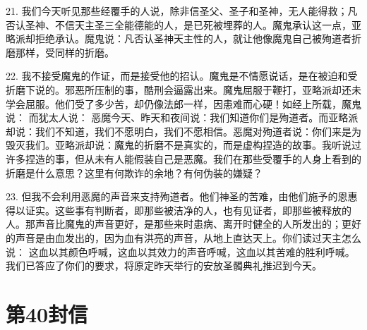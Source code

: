 21. 我们今天听见那些经覆手的人说，除非信圣父、圣子和圣神，无人能得救；凡否认圣神、不信天主圣三全能德能的人，是已死被埋葬的人。魔鬼承认这一点，亚略派却拒绝承认。魔鬼说：凡否认圣神天主性的人，就让他像魔鬼自己被殉道者折磨那样，受同样的折磨。\par

22. 我不接受魔鬼的作证，而是接受他的招认。魔鬼是不情愿说话，是在被迫和受折磨下说的。邪恶所压制的事，酷刑会逼露出来。魔鬼屈服于鞭打，亚略派却还未学会屈服。他们受了多少苦，却仍像法郎一样，因患难而心硬！如经上所载，魔鬼说： 而犹太人说： 恶魔今天、昨天和夜间说：我们知道你们是殉道者。而亚略派却说：我们不知道，我们不愿明白，我们不愿相信。恶魔对殉道者说：你们来是为毁灭我们。亚略派却说：魔鬼的折磨不是真实的，而是虚构捏造的故事。我听说过许多捏造的事，但从未有人能假装自己是恶魔。我们在那些受覆手的人身上看到的折磨是什么意思？这里有何欺诈的余地？有何伪装的嫌疑？\par

23. 但我不会利用恶魔的声音来支持殉道者。他们神圣的苦难，由他们施予的恩惠得以证实。这些事有判断者，即那些被洁净的人，也有见证者，即那些被释放的人。那声音比魔鬼的声音更好，是那些来时患病、离开时健全的人所发出的；更好的声音是由血发出的，因为血有洪亮的声音，从地上直达天上。你们读过天主怎么说： 这血以其颜色呼喊，这血以其效力的声音呼喊，这血以其苦难的胜利呼喊。我们已答应了你们的要求，将原定昨天举行的安放圣髑典礼推迟到今天。\par



\section{第40封信}

\par

